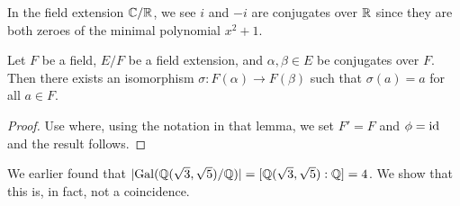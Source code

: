 \begin{example}
    In the field extension $\mathbb{C}/\mathbb{R}$, we see $i$ and $-i$ are conjugates over $\mathbb{R}$ since they are both zeroes of the minimal polynomial $x^2 + 1$.
\end{example}

\begin{proposition}
    Let $F$ be a field, $E/F$ be a field extension, and $\alpha,\beta \in E$ be conjugates over $F$. Then there exists an isomorphism $\sigma: F(\alpha) \to F(\beta)$ such that $\sigma(a) = a$ for all $a \in F$.
\end{proposition}
\begin{proof}
    Use  where, using the notation in that lemma, we set $F' = F$ and $\phi = \mathrm{id}$ and the result follows.
\end{proof}

We earlier found that $|\mathrm{Gal}(\mathbb{Q}(\sqrt3,\sqrt5)/\mathbb{Q})| = [\mathbb{Q}(\sqrt3,\sqrt5):\mathbb{Q}] = 4$. We show that this is, in fact, not a coincidence.

